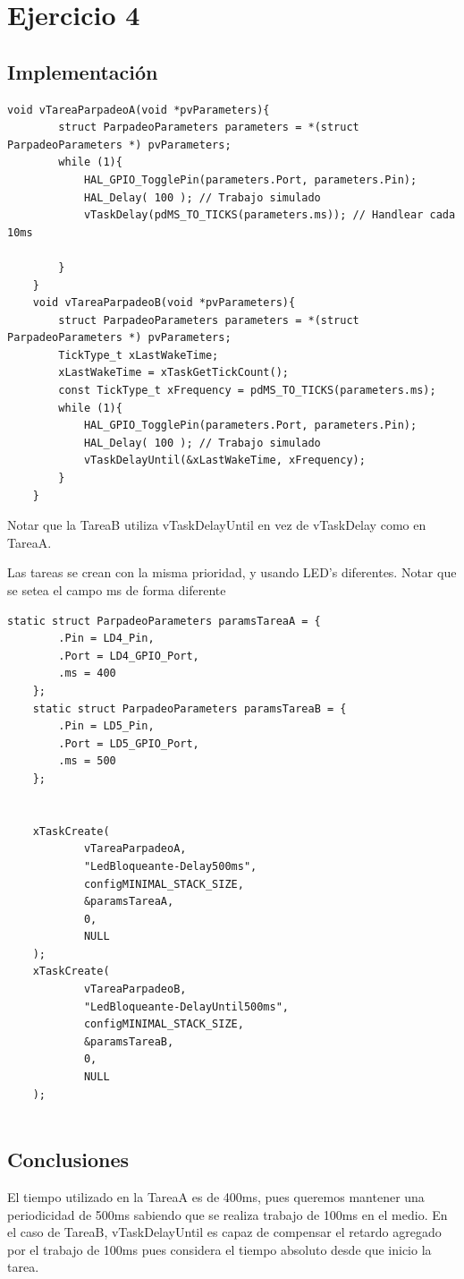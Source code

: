 \documentclass[12pt]{article}
\begin{document}
\pagebreak
\section{Ejercicio 4}
\subsection{Implementación}
\begin{lstlisting}[style=CStyle]
    void vTareaParpadeoA(void *pvParameters){
        struct ParpadeoParameters parameters = *(struct ParpadeoParameters *) pvParameters;
        while (1){
            HAL_GPIO_TogglePin(parameters.Port, parameters.Pin);
            HAL_Delay( 100 ); // Trabajo simulado
            vTaskDelay(pdMS_TO_TICKS(parameters.ms)); // Handlear cada 10ms
    
        }
    }
    void vTareaParpadeoB(void *pvParameters){
        struct ParpadeoParameters parameters = *(struct ParpadeoParameters *) pvParameters;
        TickType_t xLastWakeTime;
        xLastWakeTime = xTaskGetTickCount();
        const TickType_t xFrequency = pdMS_TO_TICKS(parameters.ms);
        while (1){
            HAL_GPIO_TogglePin(parameters.Port, parameters.Pin);
            HAL_Delay( 100 ); // Trabajo simulado
            vTaskDelayUntil(&xLastWakeTime, xFrequency);
        }
    }
\end{lstlisting}
Notar que la TareaB utiliza vTaskDelayUntil en vez de vTaskDelay como
en TareaA.
\pagebreak

Las tareas se crean con la misma prioridad, y usando LED's diferentes.
Notar que se setea el campo ms de forma 
diferente
\begin{lstlisting}[style=CStyle]
    static struct ParpadeoParameters paramsTareaA = {
        .Pin = LD4_Pin,
        .Port = LD4_GPIO_Port,
        .ms = 400
    };
    static struct ParpadeoParameters paramsTareaB = {
        .Pin = LD5_Pin,
        .Port = LD5_GPIO_Port,
        .ms = 500
    };
  
  
    xTaskCreate(
            vTareaParpadeoA,
            "LedBloqueante-Delay500ms",
            configMINIMAL_STACK_SIZE,
            &paramsTareaA,
            0,
            NULL
    );
    xTaskCreate(
            vTareaParpadeoB,
            "LedBloqueante-DelayUntil500ms",
            configMINIMAL_STACK_SIZE,
            &paramsTareaB,
            0,
            NULL
    );
  
\end{lstlisting}
\subsection{Conclusiones}
El tiempo utilizado en la TareaA es de 400ms, pues
queremos mantener una periodicidad de 500ms sabiendo
que se realiza  trabajo de 100ms en el medio.
En el caso de TareaB, vTaskDelayUntil es capaz
de compensar el retardo agregado por el trabajo de 100ms
pues considera el tiempo absoluto desde que inicio la tarea. \\
\end{document}
